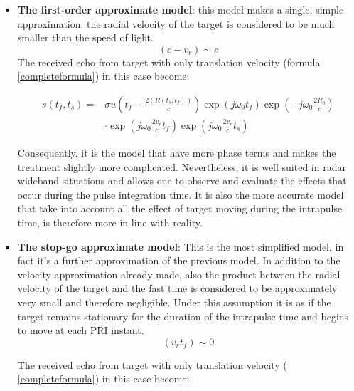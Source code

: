 \begin{itemize}
     \item \textbf{The first-order approximate model}: this model makes a single, simple approximation: the radial velocity of the target is considered to be much smaller than the speed of light. 
     \begin{equation}
        \left(c-v_{r}\right) \sim c
     \end{equation}
     The received echo from target with only translation velocity (formula \ref{completeformula}) in this case become:
     
     \begin{equation}
     \begin{aligned}
     s\left(t_{f}, t_{s}\right)=& \sigma         u\left(t_{f}-\frac{2\left(R\left(t_{s},t_{f}\right) \right)}{c}\right) \exp\left(j \omega_{0} t_{f}\right) \exp \left(-j \omega_{0} \frac{2             R_{0}}{c}\right) \\
     & \cdot \exp \left(j \omega_{0} \frac{2 v_{r}}{c} t_{f}\right) \exp \left(j         \omega_{0} \frac{2 v_{r}}{c} t_{s}\right)
     \end{aligned}
     \label{firstordermodelformula}
     \end{equation}

     
     Consequently, it is the model that have more phase terms and makes the treatment slightly more complicated. Nevertheless, it is well suited in radar wideband situations and allows one to observe and evaluate the effects that occur during the pulse integration time. It is also the more accurate model that take into account all the effect of target moving during the intrapulse time, is therefore more in line with reality.

         
    \item \textbf{The stop-go approximate model}: This is the most simplified model, in fact it's a further approximation of the previous model. In addition to the velocity approximation already made, also the product between the radial velocity of the target and the fast time is considered to be approximately very small and therefore negligible. Under this assumption it is as if the target remains stationary for the duration of the intrapulse time and begins to move at each PRI instant.
    \begin{equation}
    \left(v_{r} t_{f}\right) \sim 0
    \end{equation}
    
    The received echo from target with only translation velocity ( \ref{completeformula}) in this case become:
    

\end{itemize}
